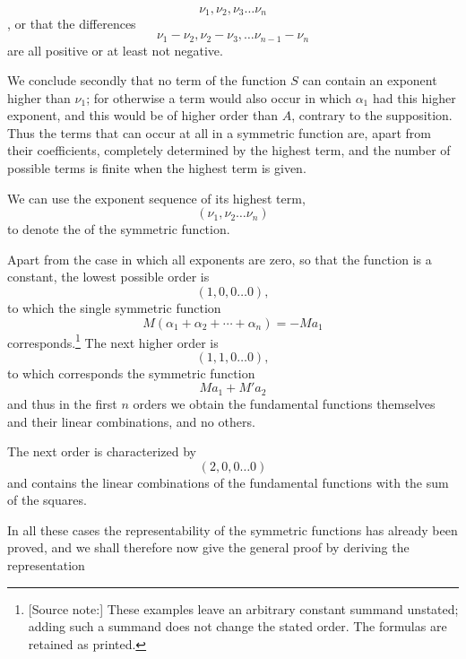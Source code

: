 \[
 \nu_1,\nu_2,\nu_3\ldots\nu_n
\]
, or that the differences
\[
 \nu_1-\nu_2,\nu_2-\nu_3,\ldots\nu_{n-1}-\nu_n
\]
are all positive or at least not negative.

We conclude secondly that no term of the function $S$ can contain an exponent higher than $\nu_1$; for otherwise a term would also occur in which $\alpha_1$ had this higher exponent, and this would be of higher order than $A$, contrary to the supposition. Thus the terms that can occur at all in a symmetric function are, apart from their coefficients, completely determined by the highest term, and the number of possible terms is finite when the highest term is given.

We can use the exponent sequence of its highest term,
\[
 (\nu_1,\nu_2\ldots\nu_n)
\]
to denote the  of the symmetric function.

Apart from the case in which all exponents are zero, so that the function is a constant, the lowest possible order is
\[
 (1,0,0\ldots0),
\]
to which the single symmetric function
\[
 M(\alpha_1+\alpha_2+\cdots+\alpha_n)=-Ma_1
\]
corresponds.\begingroup\renewcommand{\thefootnote}{E2}\footnote[1]{[Source note:] These examples leave an arbitrary constant summand unstated; adding such a summand does not change the stated order. The formulas are retained as printed.}\endgroup{} The next higher order is
\[
 (1,1,0\ldots0),
\]
to which corresponds the symmetric function
\[
 Ma_1+M'a_2
\]
and thus in the first $n$ orders we obtain the fundamental functions themselves and their linear combinations, and no others.

The next order is characterized by
\[
 (2,0,0\ldots0)
\]
and contains the linear combinations of the fundamental functions with the sum of the squares.

In all these cases the representability of the symmetric functions has already been proved, and we shall therefore now give the general proof by deriving the representation
